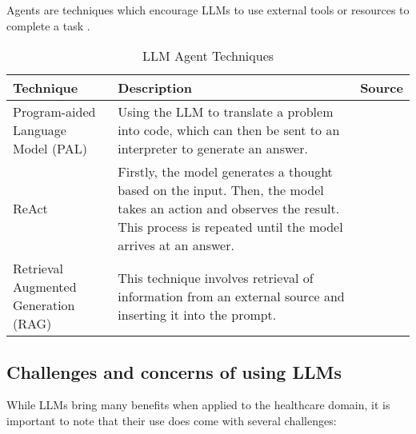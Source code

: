Agents are techniques which encourage LLMs to use external tools or resources to complete a task \parencite{prompt1}.

\begin{table}[h!]
    \centering
    \begin{tabular}{p{3cm} p{8cm} p{2cm}}
        \toprule
        \textbf{Technique} & \textbf{Description} & \textbf{Source} \\
        \midrule
        \raggedright
        Program-aided Language Model (PAL) & Using the LLM to translate a problem into code, which can then be sent to an interpreter to generate an answer. & \textcite{pal} \\
        \hline
        \raggedright
        ReAct & Firstly, the model generates a thought based on the input. Then, the model takes an action and observes the result. This process is repeated until the model arrives at an answer. & \textcite{react-llm} \\
        \hline
        \raggedright
        Retrieval Augmented Generation (RAG) & This technique involves retrieval of information from an external source and inserting it into the prompt. & \textcite{rag} \\
        \bottomrule
    \end{tabular}
    \caption{LLM Agent Techniques}\label{tab:agents}
\end{table}

\FloatBarrier{}

\subsection{Challenges and concerns of using LLMs}

While LLMs bring many benefits when applied to the healthcare domain, it is important to note that their use does come with several challenges:

